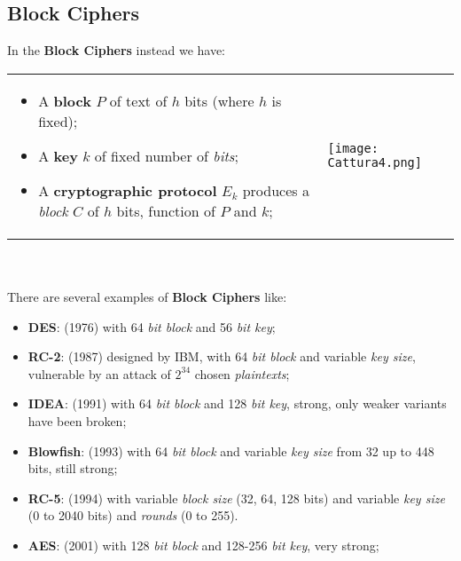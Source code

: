 \documentclass{article}
\begin{document}
\subsection{Block Ciphers}
In the \textbf{Block Ciphers} instead we have:\\
\begin{tabular}{C{12cm}  L{10.5cm}}
\begin{itemize}
\item A \textbf{block} $P$ of text of $h$ bits (where $h$ is fixed);
\item A \textbf{key} $k$ of fixed number of \emph{bits};
\item A \textbf{cryptographic protocol} $E_k$ produces a \emph{block} $C$ of $h$ bits, function of $P$ and $k$;
\end{itemize} & \texttt{[image: Cattura4.png]} 
\end{tabular}\\\\
There are several examples of \textbf{Block Ciphers} like:
\begin{itemize}
\item \textbf{DES}: (1976) with 64 \emph{bit block} and 56 \emph{bit key};
\item \textbf{RC-2}: (1987) designed by IBM, with 64 \emph{bit block} and variable \emph{key size}, vulnerable by an attack of $2^{34}$ chosen \emph{plaintexts};
\item \textbf{IDEA}: (1991) with 64 \emph{bit block} and 128\emph{ bit key}, strong, only weaker variants have been broken;
\item \textbf{Blowfish}: (1993) with 64\emph{ bit block} and variable\emph{ key size} from 32 up to 448 bits, still strong;
\item \textbf{RC-5}: (1994) with variable\emph{ block size} (32, 64, 128 bits) and variable \emph{key size} (0 to 2040 bits) and \emph{rounds} (0 to 255). 
\item \textbf{AES}: (2001) with 128 \emph{bit block} and 128-256 \emph{bit key}, very strong;
\end{itemize}
\clearpage
\end{document}
